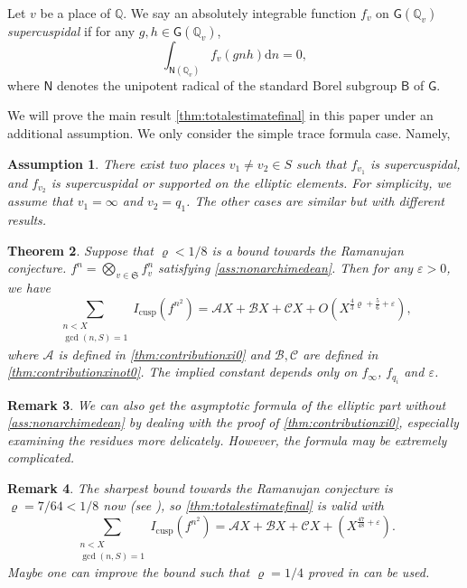 \documentclass[10pt,oneside,reqno]{amsart}
\newcommand\rmd{\mathrm{d}}
\newcommand\QQ{\mathbb{Q}}
\newcommand\mf[1]{\mathfrak{#1}}
\newcommand\ms[1]{\mathscr{#1}}
\newcommand\B{\mathsf{B}}
\newcommand\G{\mathsf{G}}
\newcommand\N{\mathsf{N}}
\theoremstyle{THEOREM}
\newtheorem{theorem}{Theorem}[section]
\theoremstyle{DEFINITION}
\newtheorem{assumption}[theorem]{Assumption}
\theoremstyle{EXERCISE}
\newtheorem{remark}[theorem]{Remark}
\numberwithin{equation}{section}
\begin{document}
Let $v$ be a place of $\QQ$. We say an absolutely integrable function $f_v$ on $\G(\QQ_v)$ \emph{supercuspidal} if for any $g,h\in \G(\QQ_v)$, 
\[
\int_{\N(\QQ_v)}f_v(gnh)\rmd n=0,
\]
where $\N$ denotes the unipotent radical of the standard Borel subgroup $\B$ of $\G$.

We will prove the main result \autoref{thm:totalestimatefinal} in this paper under an additional assumption. We only consider the simple trace formula case. Namely,

\begin{assumption}\label{ass:nonarchimedean}
There exist two places $v_1\neq v_2\in S$ such that $f_{v_1}$ is supercuspidal, and $f_{v_2}$ is supercuspidal or supported on the elliptic elements. For simplicity, we assume that $v_1=\infty$ and $v_2=q_1$. The other cases are similar but with different results.
\end{assumption}

\begin{theorem}\label{thm:totalestimatefinal}
Suppose that $\varrho<1/8$ is a bound towards the Ramanujan conjecture. $f^{n}=\bigotimes_{v\in \mf{S}}f^{n}_v$ satisfying \autoref{ass:nonarchimedean}. Then for any $\varepsilon>0$, we have
\[
\sum_{\substack{n<X\\\gcd(n,S)=1}}I_{\mathrm{cusp}}(f^{n^2})=\ms{A}X+\ms{B}X+\ms{C}X+O (X^{\frac43\varrho+\frac56+\varepsilon}),
\]
where $\ms{A}$ is defined in \autoref{thm:contributionxi0} and $\ms{B},\ms{C}$ are defined in \autoref{thm:contributionxinot0}. The implied constant depends only on $f_\infty$, $f_{q_i}$ and $\varepsilon$.
\end{theorem}
\begin{remark}
We can also get the asymptotic formula of the elliptic part without \autoref{ass:nonarchimedean} by dealing with the proof of \autoref{thm:contributionxi0}, especially examining the residues more delicately. However, the formula may be extremely complicated.
\end{remark}
\begin{remark}
The sharpest bound towards the Ramanujan conjecture is $\varrho=7/64<1/8$ now (see \cite{sarnak2005}), so \autoref{thm:totalestimatefinal} is valid with
\[
\sum_{\substack{n<X\\\gcd(n,S)=1}}I_{\mathrm{cusp}}(f^{n^2})=\ms{A}X+\ms{B}X+\ms{C}X+ (X^{\frac{47}{48}+\varepsilon}).
\]
Maybe one can improve the bound such that $\varrho=1/4$ proved in \cite{cheng2025b} can be used.
\end{remark}
\end{document}
